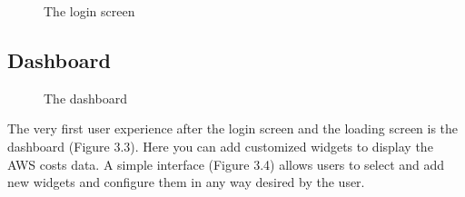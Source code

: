 \documentclass[licencjacka,en]{thesisclass}
\begin{document}
    \begin{figure}[!htbp]
      \caption{The login screen\label{fig:scr-login}}
    \end{figure}
    
    \subsection{Dashboard}
    
    \begin{figure}[!htbp]
      \caption{The dashboard\label{fig:scr-dashboard}}
    \end{figure}

    The very first user experience after the login screen and the loading screen is the dashboard (Figure 3.3).
    Here you can add customized widgets to display the AWS costs data.
    A simple interface (Figure 3.4) allows users to select and add new widgets
    and configure them in any way desired by the user.
\end{document}
